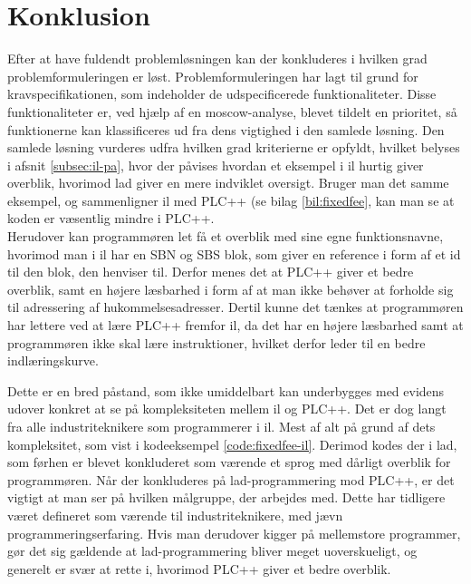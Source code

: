 \chapter{Konklusion}
\label{sec:konklusion}

Efter at have fuldendt problemløsningen kan der konkluderes i hvilken grad problemformuleringen er løst.
Problemformuleringen har lagt til grund for kravspecifikationen, som indeholder de udspecificerede funktionaliteter.
Disse funktionaliteter er, ved hjælp af en \gls{moscow}-analyse, blevet tildelt en prioritet, så funktionerne kan klassificeres ud fra dens vigtighed i den samlede løsning.
Den samlede løsning vurderes udfra hvilken grad kriterierne er opfyldt, hvilket belyses i afsnit \ref{subsec:il-pa}, hvor der påvises hvordan et eksempel i \gls{il} hurtig giver overblik, hvorimod \gls{lad} giver en mere indviklet oversigt. Bruger man det samme eksempel, og sammenligner \gls{il} med PLC++ (se bilag \ref{bil:fixedfee}, kan man se at koden er væsentlig mindre i PLC++.\\

\noindent Herudover kan programmøren let få et overblik med sine egne funktionsnavne, hvorimod man i \gls{il} har en SBN og SBS blok, som giver en reference i form af et id til den blok, den henviser til.
Derfor menes det at PLC++ giver et bedre overblik, samt en højere læsbarhed i form af at man ikke behøver at forholde sig til adressering af hukommelsesadresser.
Dertil kunne det tænkes at programmøren har lettere ved at lære PLC++ fremfor \gls{il}, da det har en højere  læsbarhed samt at programmøren ikke skal lære instruktioner, hvilket derfor leder til en bedre indlæringskurve. 

Dette er en bred påstand, som ikke umiddelbart kan underbygges med evidens udover konkret at se på kompleksiteten mellem \gls{il} og PLC++.
Det er dog langt fra alle industriteknikere som programmerer i \gls{il}. Mest af alt på grund af dets kompleksitet, som vist i kodeeksempel \ref{code:fixedfee-il}.
Derimod kodes der i \gls{lad}, som førhen er blevet konkluderet som værende et sprog med dårligt overblik for programmøren.
Når der konkluderes på \gls{lad}-programmering mod PLC++, er det vigtigt at man ser på hvilken målgruppe, der arbejdes med.
Dette har tidligere været defineret som værende til industriteknikere, med jævn programmeringserfaring.
Hvis man derudover kigger på mellemstore programmer, gør det sig gældende at \gls{lad}-programmering bliver meget uoverskueligt, og generelt er svær at rette i, hvorimod PLC++ giver et bedre overblik.\\


